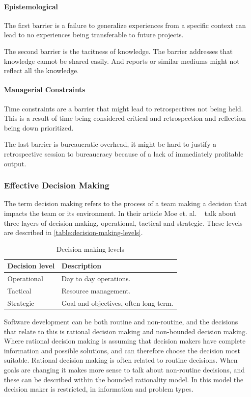 \paragraph{Epistemological}
The first barrier is a failure to generalize experiences from a specific context can lead to no experiences being transferable to future projects. 

The second barrier is the tacitness of knowledge. The barrier addresses that knowledge cannot be shared easily. And reports or similar mediums might not reflect all the knowledge.

\paragraph{Managerial Constraints}
Time constraints are a barrier that might lead to retrospectives not being held. This is a result of time being considered critical and retrospection and reflection being down prioritized. 

The last barrier is bureaucratic overhead, it might be hard to justify a retrospective session to bureaucracy because of a lack of immediately profitable output.

\subsubsection{Effective Decision Making}
The term decision making refers to the process of a team making a decision that impacts the team or its environment. In their article Moe et. al. ~\cite{Moe2011} talk about three layers of decision making, operational, tactical and strategic. These levels are described in \autoref{table:decision-making-levels}. 

\begin{table}[h]
	\begin{center}
		\caption{Decision making levels}
		\label{table:decision-making-levels}
		\begin{tabular}{l l}
			\hline
			Decision level & Description \\
			\hline
			Operational & Day to day operations. \\
			Tactical & Resource management.\\
			Strategic & Goal and objectives, often long term. \\
			\hline
		\end{tabular}
	\end{center}
\end{table}

Software development can be both routine and non-routine, and the decisions that relate to this is rational decision making and non-bounded decision making. Where rational decision making is assuming that decision makers have complete information and possible solutions, and can therefore choose the decision most suitable. Rational decision making is often related to routine decisions. When goals are changing it makes more sense to talk about non-routine decisions, and these can be described within the bounded rationality model. In this model the decision maker is restricted, in information and problem types. 

